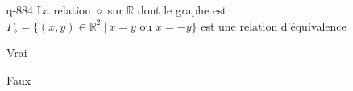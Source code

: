 \begin{truefalse}{q-884}
La relation $\diamond$ sur $\mathbb R$ dont le graphe est $\Gamma_\diamond=\{(x,y)\in\mathbb R^2\:|\: x=y\text{ ou } x=-y\}$ est une relation d'équivalence
\item* Vrai
\item Faux
\end{truefalse}

